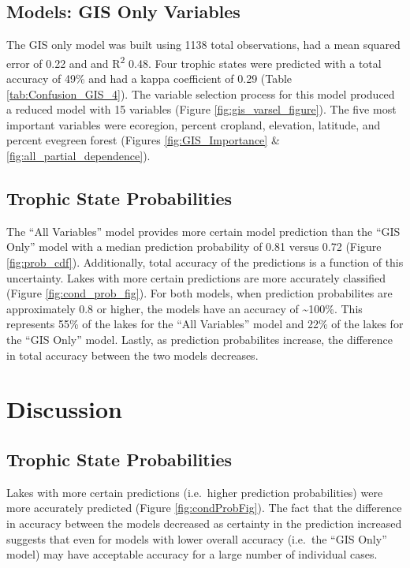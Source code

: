 \documentclass[11pt,]{article}
\begin{document}
\subsection{Models: GIS Only Variables}\label{models-gis-only-variables}

The GIS only model was built using 1138 total observations, had a mean
squared error of 0.22 and and R\textsuperscript{2} 0.48. Four trophic
states were predicted with a total accuracy of 49\% and had a kappa
coefficient of 0.29 (Table \ref{tab:Confusion_GIS_4}). The variable
selection process for this model produced a reduced model with 15
variables (Figure \ref{fig:gis_varsel_figure}). The five most important
variables were ecoregion, percent cropland, elevation, latitude, and
percent evegreen forest (Figures \ref{fig:GIS_Importance} \&
\ref{fig:all_partial_dependence}).

\subsection{Trophic State
Probabilities}\label{trophic-state-probabilities-1}

The ``All Variables'' model provides more certain model prediction than
the ``GIS Only'' model with a median prediction probability of 0.81
versus 0.72 (Figure \ref{fig:prob_cdf}). Additionally, total accuracy of
the predictions is a function of this uncertainty. Lakes with more
certain predictions are more accurately classified (Figure
\ref{fig:cond_prob_fig}). For both models, when prediction probabilites
are approximately 0.8 or higher, the models have an accuracy of
\textasciitilde{}100\%. This represents 55\% of the lakes for the ``All
Variables'' model and 22\% of the lakes for the ``GIS Only'' model.
Lastly, as prediction probabilites increase, the difference in total
accuracy between the two models decreases.

\section{Discussion}\label{discussion}

\subsection{Trophic State
Probabilities}\label{trophic-state-probabilities-2}

Lakes with more certain predictions (i.e.~higher prediction
probabilities) were more accurately predicted (Figure
\ref{fig:condProbFig}). The fact that the difference in accuracy between
the models decreased as certainty in the prediction increased suggests
that even for models with lower overall accuracy (i.e.~the ``GIS Only''
model) may have acceptable accuracy for a large number of individual
cases.
\end{document}
